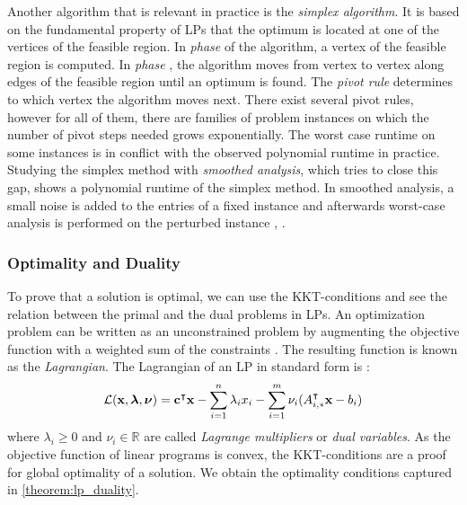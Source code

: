 Another algorithm that is relevant in practice is the \textit{simplex algorithm}. It is based on the fundamental property of LPs that the optimum is located at one of the vertices of the feasible region. %
In \textit{phase } of the algorithm, a vertex of the feasible region is computed. In \textit{phase }, the algorithm moves from vertex to vertex along edges of the feasible region until an optimum is found. The \textit{pivot rule} determines to which vertex the algorithm moves next. There exist several pivot rules, however for all of them, there are families of problem instances on which the number of pivot steps needed grows exponentially. The worst case runtime on some instances is in conflict with the observed polynomial runtime in practice. Studying the simplex method with \textit{smoothed analysis}, which tries to close this gap, shows a polynomial runtime of the simplex method. In smoothed analysis, a small noise is added to the entries of a fixed instance and afterwards worst-case analysis is performed on the perturbed instance \cite{huiberts}, \cite{dadush}.

\subsubsection{Optimality and Duality}
To prove that a solution is optimal, we can use the KKT-conditions and see the relation between the primal and the dual problems in LPs. 
An optimization problem can be written as an unconstrained problem by augmenting the objective function with a weighted sum of the constraints \cite{boyd_stephen_convex_2004}. The resulting function is known as the \textit{Lagrangian}.
The Lagrangian of an LP in standard form is \cite{noauthor_numerical_2006}: 
\begin{equation} \label{Eq:lagrangian}
\mathcal{L} (\bold x, \boldsymbol{\lambda}, \boldsymbol \nu) = \bold c^\intercal \bold x - \sum_{i=1}^n \lambda_i x_i - \sum_{i=1}^m \bold \nu_i (A_{i,*}^\intercal \bold x - b_i)
\end{equation} %
where $\lambda_i \geq 0$ and $\nu_i \in \mathbb{R}$ are called \textit{Lagrange multipliers} or \textit{dual variables}.
As the objective function of linear programs is convex, the KKT-conditions are a proof for global optimality of a solution. We obtain the optimality conditions captured in \cref{theorem:lp_duality}. 

